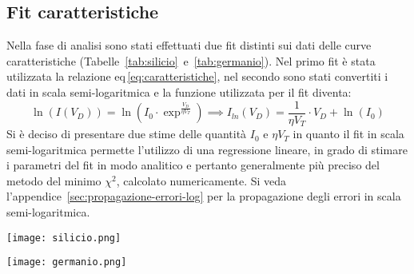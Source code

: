 \documentclass[@SRC@/main]{subfiles}
\begin{document}
  \subsection{Fit caratteristiche}
    Nella fase di analisi sono stati effettuati due fit distinti sui dati delle curve
    caratteristiche (Tabelle~\ref{tab:silicio}~e~\ref{tab:germanio}).
    Nel primo fit è stata utilizzata la relazione eq\,\eqref{eq:caratteristiche},
    nel secondo sono stati convertiti i dati in
    scala semi-logaritmica e la funzione utilizzata per il fit diventa:
    \vspace{0.5cm}
    \begin{equation*}
      \ln  (I(V_D)) = \ln \left( I_0 \cdot \exp^{\frac{V_D}{\eta V_T}} \right) \implies
      I_{ln}(V_D) = \frac{1}{\eta V_T} \cdot V_D + \ln (I_0)
    \end{equation*}
    \newpage
    \noindent Si è deciso di presentare due stime delle quantità $I_{0}$ e $\eta V_{T}$
    in quanto il fit in scala semi-logaritmica
    permette l'utilizzo di una regressione lineare, in grado di stimare i parametri del fit in modo analitico e
    pertanto
    generalmente più preciso del metodo del minimo $\chi^2$, calcolato numericamente.
    Si veda l'appendice~\ref{sec:propagazione-errori-log} per la propagazione degli
    errori in scala semi-logaritmica.
    \vspace{4pt}
    \newline
    \begin{center}
      \begin{minipage}{.95\textwidth}
        \centering
        \texttt{[image: silicio.png]}
        \label{fig:silicio}
      \end{minipage}
    \end{center}
    \vspace{0.5pt}
    \begin{center}
      \begin{minipage}[t]{.95\textwidth}
        \centering
        \texttt{[image: germanio.png]}
        \label{fig:germanio}
      \end{minipage}
    \end{center}
    \vspace{1.5cm}
\end{document}
